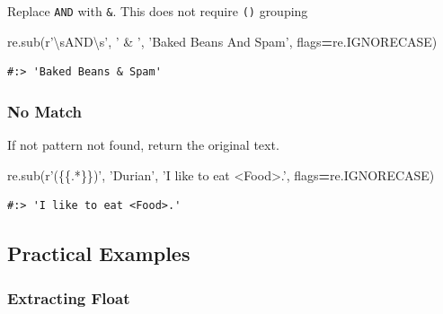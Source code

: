 \documentclass[
]{book}
\newenvironment{Shaded}{\begin{snugshade}}{\end{snugshade}}
\newcommand{\NormalTok}[1]{#1}
\newcommand{\OperatorTok}[1]{\textcolor[rgb]{0.43,0.43,0.43}{\textbf{#1}}}
\newcommand{\SpecialCharTok}[1]{\textcolor[rgb]{0,0,0}{#1}}
\newcommand{\StringTok}[1]{\textcolor[rgb]{0.5,0.5,0.5}{#1}}
\newcommand{\VerbatimStringTok}[1]{\textcolor[rgb]{0.5,0.5,0.5}{#1}}
\begin{document}
Replace \texttt{AND} with \texttt{\&}. This does not require \texttt{()} grouping

\begin{Shaded}
\begin{Highlighting}[]
\NormalTok{re.sub(}\VerbatimStringTok{r'\textbackslash{}sAND\textbackslash{}s'}\NormalTok{, }\StringTok{' & '}\NormalTok{, }\StringTok{'Baked Beans And Spam'}\NormalTok{, flags}\OperatorTok{=}\NormalTok{re.IGNORECASE)}
\end{Highlighting}
\end{Shaded}

\begin{verbatim}
#:> 'Baked Beans & Spam'
\end{verbatim}

\hypertarget{no-match}{%
\subsubsection{No Match}\label{no-match}}

If not pattern not found, return the original text.

\begin{Shaded}
\begin{Highlighting}[]
\NormalTok{re.sub(}\VerbatimStringTok{r'(}\SpecialCharTok{\{\{}\VerbatimStringTok{.*}\SpecialCharTok{\}\}}\VerbatimStringTok{)'}\NormalTok{, }\StringTok{'Durian'}\NormalTok{, }\StringTok{'I like to eat <Food>.'}\NormalTok{, flags}\OperatorTok{=}\NormalTok{re.IGNORECASE)}
\end{Highlighting}
\end{Shaded}

\begin{verbatim}
#:> 'I like to eat <Food>.'
\end{verbatim}

\hypertarget{practical-examples}{%
\subsection{Practical Examples}\label{practical-examples}}

\hypertarget{extracting-float}{%
\subsubsection{Extracting Float}\label{extracting-float}}
\end{document}
